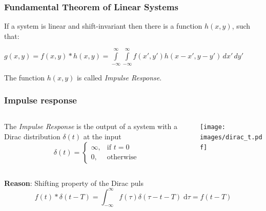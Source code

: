 \begin{frame}
    \frametitle{Fundamental Theorem of Linear Systems}
    \begin{myDefinition}
        If a system is linear and shift-invariant then there is a function $h(x,y)$, such that:
        \begin{center}
            $g(x,y) = f(x,y) \ast h(x,y) = \int\limits_{-\infty}^{\infty}\int\limits_{-\infty}^{\infty} f(x',y')h(x-x',y-y') \, dx' \, dy'$
        \end{center}

        \vspace{5 mm}

        The function $h(x,y)$ is called \textit{Impulse Response}.
    \end{myDefinition}
\end{frame}


\begin{frame}
    \frametitle{Impulse response}

    \begin{columns}[c, onlytextwidth]
        \begin{column}{.48\linewidth}
            \hspace{1.2cm}\begin{myDefinition}
                The \textit{Impulse Response} is the output of a system with a Dirac distribution $\delta(t)$ at the input
                \begin{equation*}
                    \delta(t) = \begin{cases}
                        \infty, & \text{if } t = 0 \\
                        0,      & \text{otherwise}
                    \end{cases}
                \end{equation*}
            \end{myDefinition}
        \end{column}
        \hfill{}%
        \begin{column}{.48\linewidth}
            \begin{center}

                \texttt{[image: images/dirac\_t.pdf]}
            \end{center}
        \end{column}
    \end{columns}

    \vspace{0.5cm}
    \textbf{Reason}: Shifting property of the Dirac puls
    \begin{equation*}
        f(t) * \delta(t-T) = \int_{-\infty}^{\infty}{f(\tau)\delta(\tau - t - T)\; \mathrm{d}\tau} = f(t-T)
    \end{equation*}

\end{frame}

